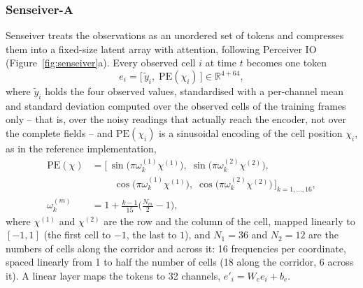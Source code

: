 \documentclass[english, 12pt, a4paper, elec, utf8, a-2b, online]{aaltothesis}
\begin{document}
\subsubsection{Senseiver-A}
\label{sec:senseiver_a}

Senseiver \cite{santos2023senseiver} treats the observations as an unordered
set of tokens and compresses them into a fixed-size latent array with
attention, following Perceiver IO \cite{jaegle2021perceiver}
(Figure~\ref{fig:senseiver}a). Every observed cell $i$ at time $t$ becomes one
token
\begin{equation}
	e_i = \big[\, \tilde{y}_i,\; \mathrm{PE}(\chi_i) \,\big] \in \mathbb{R}^{4+64},
	\label{eq:sv_token}
\end{equation}
where $\tilde{y}_i$ holds the four observed values, standardised with a
per-channel mean and standard deviation computed over the observed cells of the
training frames only -- that is, over the noisy readings that actually reach the
encoder, not over the complete fields -- and
$\mathrm{PE}(\chi_i)$ is a sinusoidal encoding of the cell position $\chi_i$, as
in the reference implementation,
\begin{equation}
	\begin{aligned}
	\mathrm{PE}(\chi) &= \Big[\, \sin\!\big(\pi \omega^{(1)}_k \chi^{(1)}\big),\;
	\sin\!\big(\pi \omega^{(2)}_k \chi^{(2)}\big),\; \\
	&\qquad\; \cos\!\big(\pi \omega^{(1)}_k \chi^{(1)}\big),\;
	\cos\!\big(\pi \omega^{(2)}_k \chi^{(2)}\big) \,\Big]_{k = 1, \dots, 16}, \\
	\omega^{(m)}_k &= 1 + \frac{k - 1}{15} \Big( \frac{N_m}{2} - 1 \Big),
	\end{aligned}
	\label{eq:sv_pe}
\end{equation}
where $\chi^{(1)}$ and $\chi^{(2)}$ are the row and the column of the cell,
mapped linearly to $[-1, 1]$ (the first cell to $-1$, the last to $1$), and
$N_1 = 36$ and $N_2 = 12$ are the numbers of cells along the corridor and
across it: 16 frequencies per coordinate, spaced linearly from 1 to half the
number of cells (18 along the corridor, 6 across it). A linear layer maps the
tokens to 32 channels, $e'_i = W_e e_i + b_e$.
\end{document}
